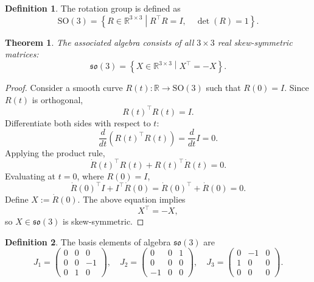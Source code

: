 \documentclass{amsart}
\newtheorem{theorem}{Theorem}[section]
\theoremstyle{definition}
\newtheorem{definition}{Definition}[theorem]
\theoremstyle{remark}
\begin{document}
\begin{definition}
  The rotation group is defined as
  \begin{equation*}
  \mathrm{SO}(3) = \left\{ R \in \mathbb{R}^{3 \times 3} \middle|
  R^\top R = I, \quad \det(R) = 1 \right\}.
  \end{equation*}
\end{definition}

\begin{theorem}\label{thm:so3_algebra_skew_symmetric}
  The associated algebra consists of all $3 \times 3$ real skew-symmetric matrices:
  \begin{equation*}
  \mathfrak{so}(3) = \left\{ X \in \mathbb{R}^{3 \times 3} \middle|
  X^\top = -X \right\}.
  \end{equation*}
\end{theorem}

\begin{proof}
  Consider a smooth curve $R(t): \mathbb{R} \to \mathrm{SO}(3)$ such that $R(0) = I$. Since $R(t)$ is orthogonal,
  \begin{equation*}
  R(t)^\top R(t) = I.
  \end{equation*}
  Differentiate both sides with respect to $t$:
  \begin{equation*}
  \frac{d}{dt} \left( R(t)^\top R(t) \right) = \frac{d}{dt} I = 0.
  \end{equation*}
  Applying the product rule,
  \begin{equation*}
  \dot{R}(t)^\top R(t) + R(t)^\top \dot{R}(t) = 0.
  \end{equation*}
  Evaluating at $t=0$, where $R(0) = I$,
  \begin{equation*}
  \dot{R}(0)^\top I + I^\top \dot{R}(0) = \dot{R}(0)^\top + \dot{R}(0) = 0.
  \end{equation*}
  Define $X := \dot{R}(0)$. The above equation implies
  \begin{equation*}
  X^\top = -X,
  \end{equation*}
  so $X \in \mathfrak{so}(3)$ is skew-symmetric.
\end{proof}

\begin{definition}
  The basis elements of algebra $\mathfrak{so}(3)$ are
  \begin{equation*}
  J_1 = \begin{pmatrix} 0 & 0 & 0 \\ 0 & 0 & -1 \\ 0 & 1 & 0 \end{pmatrix}, \quad
  J_2 = \begin{pmatrix} 0 & 0 & 1 \\ 0 & 0 & 0 \\ -1 & 0 & 0 \end{pmatrix}, \quad
  J_3 = \begin{pmatrix} 0 & -1 & 0 \\ 1 & 0 & 0 \\ 0 & 0 & 0 \end{pmatrix}.
  \end{equation*}
\end{definition}
\end{document}
